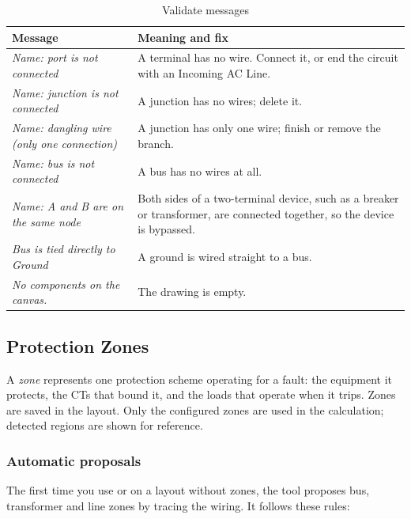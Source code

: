 \begin{table}[H]
  \centering
  \caption{Validate messages}
  \label{tab:validate}
  \begin{tabularx}{\textwidth}{l L}
    \toprule
    \textbf{Message} & \textbf{Meaning and fix} \\
    \midrule
    \emph{Name: port is not connected} & A terminal has no wire. Connect it, or end the circuit with an Incoming AC Line. \\
    \emph{Name: junction is not connected} & A junction has no wires; delete it. \\
    \emph{Name: dangling wire (only one connection)} & A junction has only one wire; finish or remove the branch. \\
    \emph{Name: bus is not connected} & A bus has no wires at all. \\
    \emph{Name: A and B are on the same node} & Both sides of a two-terminal device, such as a breaker or transformer, are connected together, so the device is bypassed. \\
    \emph{Bus is tied directly to Ground} & A ground is wired straight to a bus. \\
    \emph{No components on the canvas.} & The drawing is empty. \\
    \bottomrule
  \end{tabularx}
\end{table}

\subsection{Protection Zones}\label{sec:zones}

A \emph{zone} represents one protection scheme operating for a fault: the equipment it
protects, the CTs that bound it, and the loads that operate when it trips. Zones are
saved in the layout. Only the configured zones are used in the calculation; detected
regions are shown for reference.

\subsubsection{Automatic proposals}

The first time you use  or  on a layout without
zones, the tool proposes bus, transformer and line zones by tracing the wiring. It
follows these rules:


